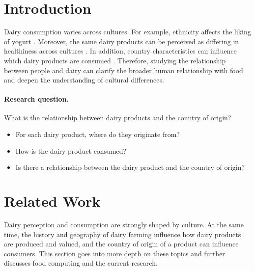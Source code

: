 \documentclass[sigconf]{acmart-txmm}
\begin{document}
\maketitle

\section{Introduction}
\label{sec:intro}
Dairy consumption varies across cultures.
For example, ethnicity affects the liking of yogurt \cite{LiuJing2021Palo}. 
Moreover, the same dairy products can be perceived as differing in healthiness across cultures \cite{JohansenSusanneBølling2011Mfca}.
In addition, country characteristics can influence which dairy products are consumed \cite{LiemD.G.2016ScIo}.
Therefore, studying the relationship between people and dairy can clarify the broader human relationship with food and deepen the understanding of cultural differences.

\paragraph{Research question.}
What is the relationship between dairy products and the country of origin?
\begin{itemize}
    \item For each dairy product, where do they originate from?
    \item How is the dairy product consumed?
    \item Is there a relationship between the dairy product and the country of origin?
\end{itemize}

\section{Related Work}
\label{sec:work}
Dairy perception and consumption are strongly shaped by culture.
At the same time, the history and geography of dairy farming influence how dairy products are produced and valued, and the country of origin of a product can influence consumers.
This section goes into more depth on these topics and further discusses food computing and the current research.
\end{document}
